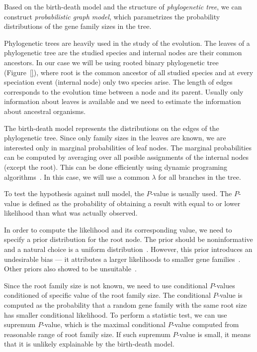 Based on the birth-death model and the structure of \emph{phylogenetic tree}, we can construct \emph{probabilistic graph model}, which parametrizes the probability distributions of the gene family sizes in the tree.

Phylogenetic trees are heavily used in the study of the evolution. The leaves of a phylogenetic tree are the studied species and internal nodes are their common ancestors. In our case we will be using rooted binary phylogenetic tree (Figure~\ref{}), where root is the common ancestor of all studied species and at every speciation event (internal node) only two species arise. The length of edges corresponds to the evolution time between a node and its parent. Usually only information about leaves is available and we need to estimate the information about ancestral organisms.

The birth-death model represents the distributions on the edges of the phylogenetic tree. Since only family sizes in the leaves are known, we are interested only in marginal probabilities of leaf nodes. The marginal probabilities can be computed by averaging over all posible assignments of the internal nodes (except the root). This can be done efficiently using dynamic programing algorithms~\cite{felsenstein1981evolutionary}. In this case, we will use a common $\lambda$ for all branches in the tree.

To test the hypothesis against null model, the $P$-value is usually used. The $P$-value is defined as the probability of obtaining a result with equal to or lower likelihood than what was actually observed.

In order to compute the likelihood and its corresponding value, we need to specify a prior distribution for the root node. The prior should be noninformative and a natural choice is a uniform distribution~\cite{felsenstein1981evolutionary}. However, this prior introduces an undesirable bias --- it attributes a larger likelihoods to smaller gene families~\cite{hahn2005estimating}. Other priors also showed to be unsuitable~\cite{hahn2005estimating}.

Since the root family size is not known, we need to use conditional $P$-values conditioned of specific value of the root family size.
The conditional $P$-value is computed as the probability that a random gene family with the same root size has smaller conditional likelihood.
To perform a statistic test, we can use supremum $P$-value, which is the maximal conditional $P$-value computed from reasonable range of root family size.
If such supremum $P$-value is small, it means that it is unlikely explainable by the birth-death model.

